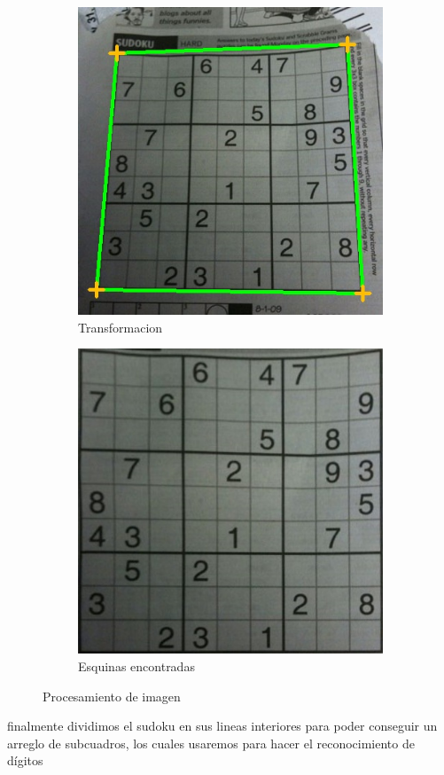 \documentclass{article}
\begin{document}
\begin{figure}[H]
\centering
\begin{subfigure}{.5\textwidth}
  \centering
  \includegraphics[width=.6\linewidth]{esquinas}
  \caption{Transformacion}
  \label{fig:sub1}
\end{subfigure}%
\begin{subfigure}{.5\textwidth}
  \centering
  \includegraphics[width=.6\linewidth]{transformada}
  \caption{Esquinas encontradas}
  \label{fig:sub2}
\end{subfigure}
\caption{Procesamiento de imagen}
\label{fig:test}
\end{figure}

finalmente dividimos el sudoku en sus lineas interiores  para poder conseguir
un arreglo de subcuadros, los cuales usaremos para hacer el reconocimiento de 
dígitos
\end{document}
